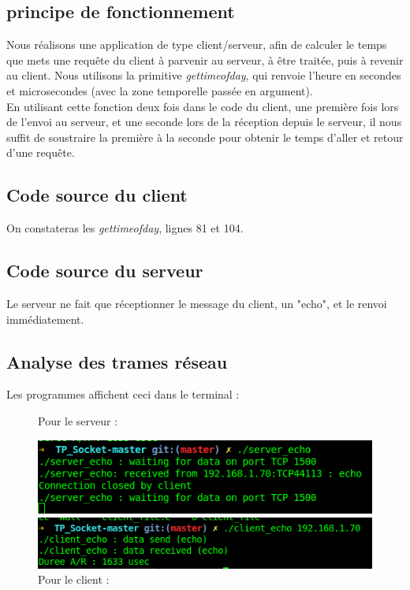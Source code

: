 \documentclass[10pt,a4paper,final]{article}
\begin{document}
	\subsection{principe de fonctionnement}
		Nous réalisons une application de type client/serveur, afin de calculer le temps que mets une requête du client à parvenir au serveur, à être traitée, puis à revenir au 				client. Nous utilisons la primitive \textit{\textrm{gettimeofday}}, qui renvoie l'heure en secondes et microsecondes (avec la zone temporelle passée en argument).\\
		En utilisant cette fonction deux fois dans le code du client, une première fois lors de l'envoi au serveur, et une seconde lors de la réception depuis le serveur, il nous 				suffit de soustraire la première à la seconde pour obtenir le temps d'aller et retour d'une requête.
				
	\subsection{Code source du client}
		On constateras les \textit{\textrm{gettimeofday}}, lignes 81 et 104.
		
		
	\subsection{Code source du serveur}
		Le serveur ne fait que réceptionner le message du client, un "echo", et le renvoi immédiatement.
		

	\subsection{Analyse des trames réseau}
		Les programmes affichent ceci dans le terminal :\\
		
		\begin{figure}[!h] 
			\centering
			\caption{Pour le serveur :}
			\includegraphics[scale=0.5]{img/server_echo_terminal.png} 
			\caption{Pour le client :}
			\includegraphics[scale=0.5]{img/client_echo_terminal.png} 
		\end{figure}
		\newpage
		
\end{document}
